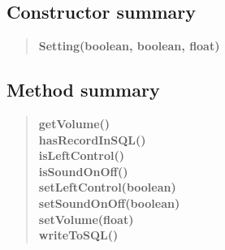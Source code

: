 \documentclass[11pt,a4paper]{report}
\begin{document}
{{{{\subsection{Constructor summary}{
\begin{verse}
{\bf Setting(boolean, boolean, float)} \\
\end{verse}
}
\subsection{Method summary}{
\begin{verse}
{\bf getVolume()} \\
{\bf hasRecordInSQL()} \\
{\bf isLeftControl()} \\
{\bf isSoundOnOff()} \\
{\bf setLeftControl(boolean)} \\
{\bf setSoundOnOff(boolean)} \\
{\bf setVolume(float)} \\
{\bf writeToSQL()} \\
\end{verse}
}
}}}}
\end{document}
